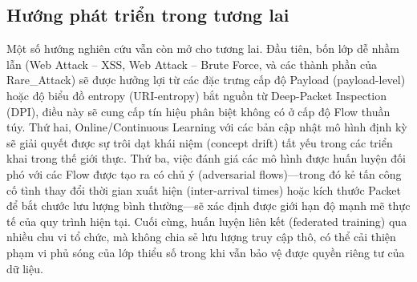 \subsection*{Hướng phát triển trong tương lai}
Một số hướng nghiên cứu vẫn còn mở cho tương lai. Đầu tiên, bốn lớp dễ nhầm lẫn (Web Attack -- XSS, Web Attack -- Brute Force, và các thành phần của Rare\_Attack) sẽ được hưởng lợi từ các đặc trưng cấp độ Payload (payload-level) hoặc độ biểu đồ entropy (URI-entropy) bắt nguồn từ Deep-Packet Inspection (DPI), điều này sẽ cung cấp tín hiệu phân biệt không có ở cấp độ Flow thuần túy. Thứ hai, Online/Continuous Learning với các bản cập nhật mô hình định kỳ sẽ giải quyết được sự trôi dạt khái niệm (concept drift) tất yếu trong các triển khai trong thế giới thực. Thứ ba, việc đánh giá các mô hình được huấn luyện đối phó với các Flow được tạo ra có chủ ý (adversarial flows)---trong đó kẻ tấn công cố tình thay đổi thời gian xuất hiện (inter-arrival times) hoặc kích thước Packet để bắt chước lưu lượng bình thường---sẽ xác định được giới hạn độ mạnh mẽ thực tế của quy trình hiện tại. Cuối cùng, huấn luyện liên kết (federated training) qua nhiều chu vi tổ chức, mà không chia sẻ lưu lượng truy cập thô, có thể cải thiện phạm vi phủ sóng của lớp thiểu số trong khi vẫn bảo vệ được quyền riêng tư của dữ liệu.
